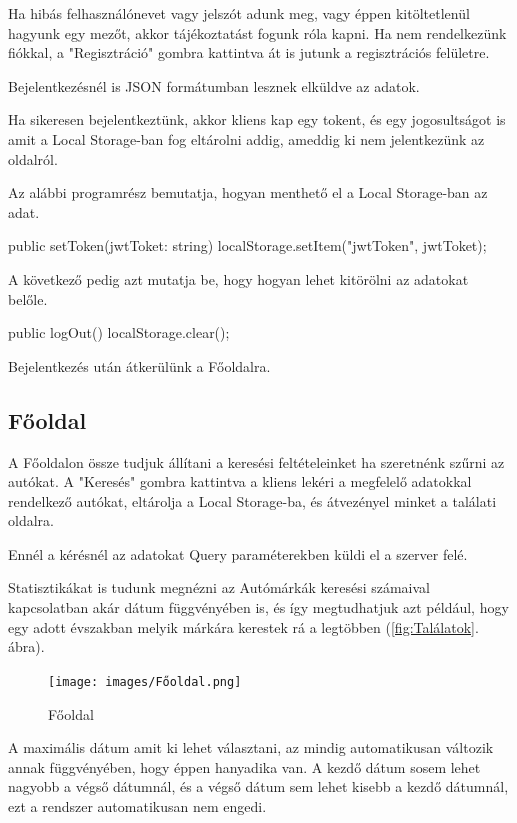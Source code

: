 Ha hibás felhasználónevet vagy jelszót adunk meg, vagy éppen kitöltetlenül hagyunk egy mezőt, akkor tájékoztatást fogunk róla kapni.
Ha nem rendelkezünk fiókkal, a "Regisztráció" gombra kattintva át is jutunk a regisztrációs felületre.

Bejelentkezésnél is JSON formátumban lesznek elküldve az adatok.

Ha sikeresen bejelentkeztünk, akkor kliens kap egy tokent, és egy jogosultságot is amit a Local Storage-ban fog eltárolni addig, ameddig ki nem jelentkezünk az oldalról.

Az alábbi programrész bemutatja, hogyan menthető el a Local Storage-ban az adat.

\begin{java}
public setToken(jwtToket: string) {
    localStorage.setItem("jwtToken", jwtToket);
}
\end{java}
A következő pedig azt mutatja be, hogy hogyan lehet kitörölni az adatokat belőle.

\begin{java}
public logOut() {
    localStorage.clear();
}
\end{java}

Bejelentkezés után átkerülünk a Főoldalra.

\subsection{Főoldal}

A Főoldalon össze tudjuk állítani a keresési feltételeinket ha szeretnénk szűrni az autókat.
A "Keresés" gombra kattintva a kliens lekéri a megfelelő adatokkal rendelkező autókat, eltárolja a Local Storage-ba, és átvezényel minket a találati oldalra.

Ennél a kérésnél az adatokat Query paraméterekben küldi el a szerver felé.

Statisztikákat is tudunk megnézni az Autómárkák keresési számaival kapcsolatban akár dátum függvényében is, és így megtudhatjuk azt például, hogy egy adott évszakban melyik márkára kerestek rá a legtöbben (\ref{fig:Találatok}. ábra).

\begin{figure}[h]
\centering
\texttt{[image: images/Főoldal.png]}
\caption{Főoldal}
\label{fig:Főoldal}
\end{figure}

A maximális dátum amit ki lehet választani, az mindig automatikusan változik annak függvényében, hogy éppen hanyadika van.
A kezdő dátum sosem lehet nagyobb a végső dátumnál, és a végső dátum sem lehet kisebb a kezdő dátumnál, ezt a rendszer automatikusan nem engedi.


